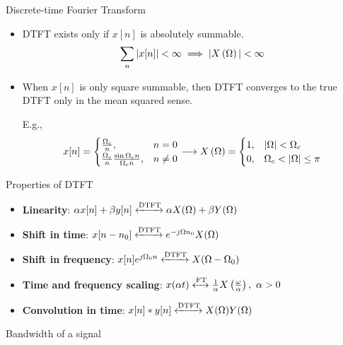 \documentclass[aspectratio=169]{beamer}
\let\olditem\item
\renewcommand{\item}{\setlength{\itemsep}{\fill}\olditem}
\def\lp{\ensuremath\left(}
\def\rp{\ensuremath\right)}
\begin{document}
\begin{frame}[t]{Discrete-time Fourier Transform}
\begin{itemize}
  \item DTFT exists only if $x[n]$ is absolutely summable.
  \[ \sum_n \vert x[n] \vert < \infty  \implies \vert X\lp \Omega \rp \vert < \infty \]

  \item When $x[n]$ is only square summable, then DTFT converges to the true DTFT only in the mean squared sense.

  E.g., 
  \[ x[n] = \begin{cases} \frac{\Omega_c}{n}, & n = 0 \\ \frac{\Omega_c}{n} \frac{\sin \Omega_c n}{\Omega_c n}, & n \neq 0 \end{cases} \longrightarrow X\lp \Omega \rp  = \begin{cases} 1, & \vert \Omega \vert < \Omega_c  \\  0, & \Omega_c < \vert \Omega \vert \leq \pi \end{cases} \]
\end{itemize}  
\end{frame}


\begin{frame}[t]{Properties of DTFT}
\begin{itemize}
  \item \textbf{Linearity}: $\alpha x[n] + \beta y[n] \xleftrightarrow{\text{DTFT}} \alpha X(\Omega) + \beta Y(\Omega)$
  \item \textbf{Shift in time}: $ x[n-n_0] \xleftrightarrow{\text{DTFT}} e^{-j\Omega n_0}X(\Omega)$
  \item \textbf{Shift in frequency}: $ x[n]e^{j\Omega_0 n} \xleftrightarrow{\text{DTFT}} X(\Omega - \Omega_0) $
  \item \textbf{Time and frequency scaling}: $ x(\alpha t) \xleftrightarrow{\text{FT}} \frac{1}{\alpha} X\left(\frac{\omega}{\alpha}\right), \,\, \alpha > 0 $
  \item \textbf{Convolution in time}: $x[n] * y[n] \xleftrightarrow{\text{DTFT}} X(\Omega)Y(\Omega)$
\end{itemize}
\end{frame}


\begin{frame}[t]{Bandwidth of a signal}

\end{frame}
\end{document}

